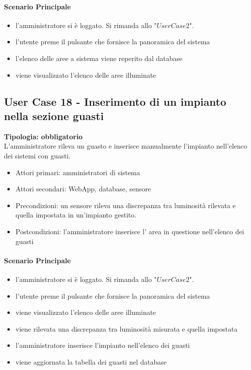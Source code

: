 \documentclass[12pt]{article}
\begin{document}
\paragraph{Scenario Principale}
\begin{itemize}
	\item l'amministratore si è loggato. Si rimanda allo "$User Case 2$".
	\item l'utente preme il pulsante che fornisce la panoramica del sistema
	\item l'elenco delle aree a sistema viene reperito dal database
	\item viene visualizzato l'elenco delle aree illuminate
\end{itemize}

\subsection{User Case 18 - Inserimento di un impianto nella sezione guasti}
\textbf{Tipologia: obbligatorio} \\
L'amministratore rileva un guasto e inserisce manualmente l'impianto nell'elenco dei sistemi con guasti.
\begin{itemize}
	\item Attori primari: amministratori di sistema
	\item Attori secondari: WebApp, database, sensore
	\item Precondizioni: un sensore rileva una discrepanza tra luminosità rilevata e quella impostata in un'impianto gestito.
	\item Postcondizioni: l'amministratore inserisce l' area in questione nell'elenco dei guasti
\end{itemize}
\paragraph{Scenario Principale}
\begin{itemize}
	\item l'amministratore si è loggato. Si rimanda allo "$User Case 2$".
	\item l'utente preme il pulsante che fornisce la panoramica del sistema
	\item viene visualizzato l'elenco delle aree illuminate
	\item viene rilevata una discrepanza tra luminosità misurata e quella impostata
	\item l'amministratore inserisce l'impianto nell'elenco dei guasti
	\item viene aggiornata la tabella dei guasti nel database
\end{itemize}
\end{document}
